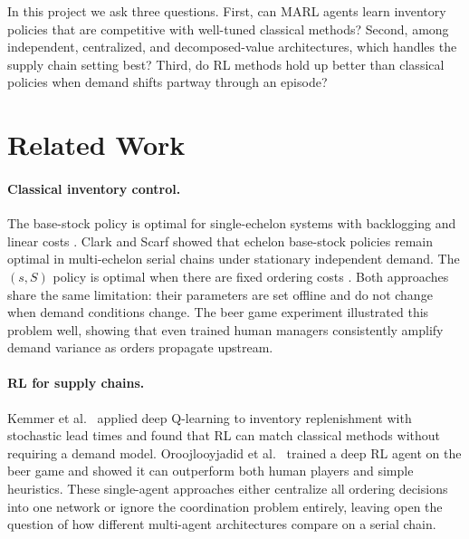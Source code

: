 \documentclass{article}
\begin{document}
In this project we ask three questions. First, can MARL agents learn
inventory policies that are competitive with well-tuned classical
methods? Second, among independent, centralized, and decomposed-value
architectures, which handles the supply chain setting best? Third, do
RL methods hold up better than classical policies when demand shifts
partway through an episode?

\section{Related Work}

\paragraph{Classical inventory control.}
The base-stock policy is optimal for single-echelon systems with
backlogging and linear costs \cite{arrow1951optimal}. Clark and Scarf
\cite{clark1960optimal} showed that echelon base-stock policies remain
optimal in multi-echelon serial chains under stationary independent
demand. The $(s,S)$ policy is optimal when there are fixed ordering
costs \cite{arrow1951optimal}. Both approaches share the same
limitation: their parameters are set offline and do not change when
demand conditions change. The beer game experiment
\cite{sterman1989modeling} illustrated this problem well, showing that
even trained human managers consistently amplify demand variance as
orders propagate upstream.

\paragraph{RL for supply chains.}
Kemmer et al.\ \cite{kemmer2018reinforcement} applied deep Q-learning to
inventory replenishment with stochastic lead times and found that RL can
match classical methods without requiring a demand model. Oroojlooyjadid
et al.\ \cite{oroojlooyjadid2022deep} trained a deep RL agent on the
beer game and showed it can outperform both human players and simple
heuristics. These single-agent approaches either centralize all
ordering decisions into one network or ignore the coordination problem
entirely, leaving open the question of how different multi-agent
architectures compare on a serial chain.
\end{document}
